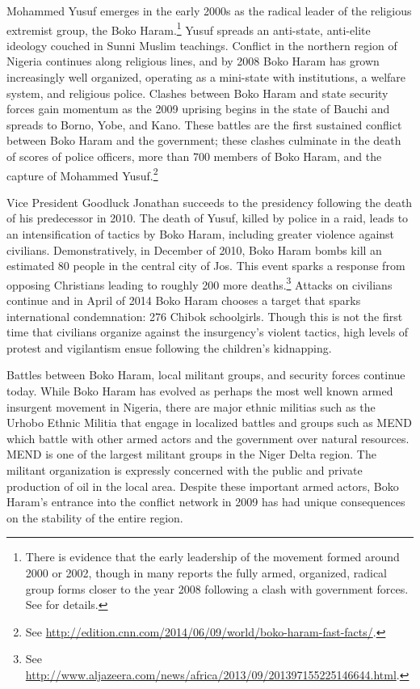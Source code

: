 Mohammed Yusuf emerges in the early 2000s as the radical leader of the religious extremist group, the Boko Haram.\footnote{There is evidence that the early leadership of the movement formed around 2000 or 2002, though in many reports the fully armed, organized, radical group forms closer to the year 2008 following a clash with government forces. See \citet{walker:2016} for details.} Yusuf spreads an anti-state, anti-elite ideology couched in Sunni Muslim teachings. Conflict in the northern region of Nigeria continues along religious lines, and by 2008 Boko Haram has grown increasingly well organized, operating as a mini-state with institutions, a welfare system, and religious police.  Clashes between Boko Haram and state security forces gain momentum as the 2009 uprising begins in the state of Bauchi and spreads to Borno, Yobe, and Kano. These battles are the first sustained conflict between Boko Haram and the government; these clashes culminate in the death of scores of police officers, more than 700 members of Boko Haram, and the capture of Mohammed Yusuf.\footnote{See \url{http://edition.cnn.com/2014/06/09/world/boko-haram-fast-facts/}.}

Vice President Goodluck Jonathan succeeds to the presidency following the death of his predecessor in 2010. The death of Yusuf, killed by police in a raid, leads to an intensification of tactics by Boko Haram, including greater violence against civilians. Demonstratively, in December of 2010, Boko Haram bombs kill an estimated 80 people in the central city of Jos. This event sparks a response from opposing Christians leading to roughly 200 more deaths.\footnote{See \url{http://www.aljazeera.com/news/africa/2013/09/201397155225146644.html}.} Attacks on civilians continue and in April of 2014 Boko Haram chooses a target that sparks international condemnation: 276 Chibok schoolgirls. Though this is not the first time that civilians organize against the insurgency's violent tactics, high levels of protest and vigilantism ensue following the children's kidnapping. 

Battles between Boko Haram, local militant groups, and security forces continue today. While Boko Haram has evolved as perhaps the most well known armed insurgent movement in Nigeria, there are major ethnic militias such as the Urhobo Ethnic Militia that engage in localized battles and groups such as MEND which battle with other armed actors and the government over natural resources. MEND is one of the largest militant groups in the Niger Delta region. The militant organization is expressly concerned with the public and private production of oil in the local area. Despite these important armed actors, Boko Haram's entrance into the conflict network in 2009 has had unique consequences on the stability of the entire region.

